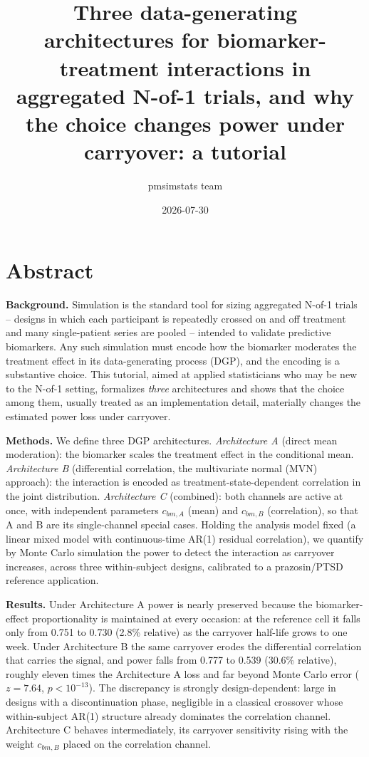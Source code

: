 \documentclass[
  11pt,
]{article}
\title{Three data-generating architectures for biomarker-treatment
interactions in aggregated N-of-1 trials, and why the choice changes
power under carryover: a tutorial}
\author{pmsimstats team}
\date{2026-07-30}
\begin{document}
\maketitle

\section{Abstract}

\textbf{Background.} Simulation is the standard tool for sizing
aggregated N-of-1 trials -- designs in which each participant is
repeatedly crossed on and off treatment and many single-patient series
are pooled -- intended to validate predictive biomarkers. Any such
simulation must encode how the biomarker moderates the treatment effect
in its data-generating process (DGP), and the encoding is a substantive
choice. This tutorial, aimed at applied statisticians who may be new to
the N-of-1 setting, formalizes \emph{three} architectures and shows that
the choice among them, usually treated as an implementation detail,
materially changes the estimated power loss under carryover.

\textbf{Methods.} We define three DGP architectures.
\emph{Architecture A} (direct mean moderation): the biomarker scales the
treatment effect in the conditional mean. \emph{Architecture B}
(differential correlation, the multivariate normal (MVN) approach): the
interaction is encoded as treatment-state-dependent correlation in the
joint distribution. \emph{Architecture C} (combined): both channels are
active at once, with independent parameters \(c_{bm,A}\) (mean) and
\(c_{bm,B}\) (correlation), so that A and B are its single-channel
special cases. Holding the analysis model fixed (a linear mixed model
with continuous-time AR(1) residual correlation), we quantify by Monte
Carlo simulation the power to detect the interaction as carryover
increases, across three within-subject designs, calibrated to a
prazosin/PTSD reference application.

\textbf{Results.} Under Architecture A power is nearly preserved because
the biomarker-effect proportionality is maintained at every occasion: at
the reference cell it falls only from 0.751 to 0.730 (2.8\% relative) as
the carryover half-life grows to one week. Under Architecture B the same
carryover erodes the differential correlation that carries the signal,
and power falls from 0.777 to 0.539 (30.6\% relative), roughly eleven
times the Architecture A loss and far beyond Monte Carlo error
(\(z = 7.64\), \(p < 10^{-13}\)). The discrepancy is strongly
design-dependent: large in designs with a discontinuation phase,
negligible in a classical crossover whose within-subject AR(1) structure
already dominates the correlation channel. Architecture C behaves
intermediately, its carryover sensitivity rising with the weight
\(c_{bm,B}\) placed on the correlation channel.
\end{document}
